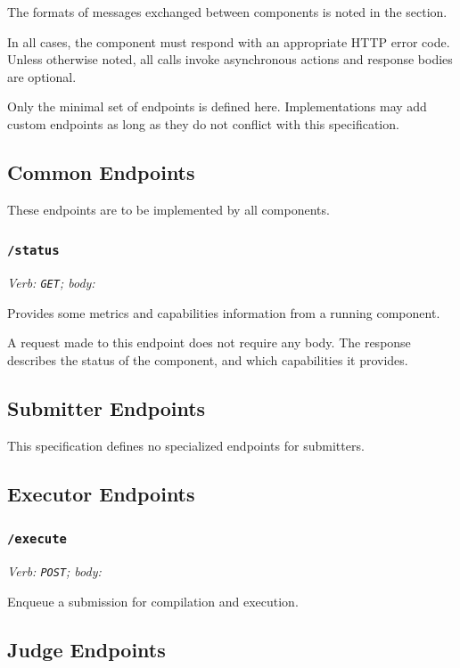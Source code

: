 \documentclass[11pt,letterpaper]{article}
\begin{document}
The formats of messages exchanged between components is noted in the
 section.

In all cases, the component must respond with an appropriate HTTP error code.
Unless otherwise noted, all calls invoke asynchronous actions and response
bodies are optional.

Only the minimal set of endpoints is defined here. Implementations may add
custom endpoints as long as they do not conflict with this specification.

\subsection{Common Endpoints}
\label{endpoints-common}

These endpoints are to be implemented by all components.

\subsubsection{\texttt{/status}}

\emph{Verb: \texttt{GET}; body: }

Provides some metrics and capabilities information from a running component.

A request made to this endpoint does not require any body. The response
describes the status of the component, and which capabilities it provides.

\subsection{Submitter Endpoints}
\label{endpoints-sub}

This specification defines no specialized endpoints for submitters.

\subsection{Executor Endpoints}
\label{endpoints-exec}

\subsubsection{\texttt{/execute}}

\emph{Verb: \texttt{POST}; body: }

Enqueue a submission for compilation and execution.

\subsection{Judge Endpoints}
\label{endpoints-judge}
\end{document}
